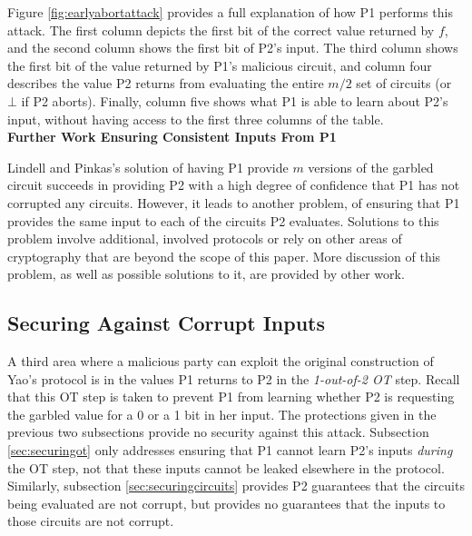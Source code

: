 Figure \ref{fig:earlyabortattack} provides a full explanation of how \ac{P1} performs this attack.  The first column depicts the first bit of the correct value returned by $f$, and the second column shows the first bit of \ac{P2}'s input.  The third column shows the first bit of the value returned by \ac{P1}'s malicious circuit, and column four describes the value \ac{P2} returns from evaluating the entire $m/2$ set of circuits (or $\bot$ if \ac{P2} aborts).  Finally, column five shows what \ac{P1} is able to learn about \ac{P2}'s input, without having access to the first three columns of the table.\\[.5em]


\noindent\textbf{Further Work Ensuring Consistent Inputs From \ac{P1}}

Lindell and Pinkas's\cite{lindell2007efficient} solution of having \ac{P1} provide $m$ versions of the garbled circuit succeeds in providing \ac{P2} with a high degree of confidence that \ac{P1} has not corrupted any circuits.  However, it leads to another problem, of ensuring that \ac{P1} provides the same input to each of the circuits \ac{P2} evaluates.  Solutions to this problem involve additional, involved protocols\cite{lindell2007efficient} or rely on other areas of cryptography\cite{shen2011two} that are beyond the scope of this paper.  More discussion of this problem, as well as possible solutions to it, are provided by other work\cite{kreuter2012billion}.


\subsection{Securing Against Corrupt Inputs}
\label{sub:inputattacks}

A third area where a malicious party can exploit the original construction of Yao's protocol is in the values \ac{P1} returns to \ac{P2} in the \emph{1-out-of-2 \ac{OT}} step.  Recall that this \ac{OT} step is taken to prevent \ac{P1} from learning whether \ac{P2} is requesting the garbled value for a 0 or a 1 bit in her input.  The protections given in the previous two subsections provide no security against this attack. Subsection \ref{sec:securingot} only addresses ensuring that \ac{P1} cannot learn \ac{P2}'s inputs \emph{during} the \ac{OT} step, not that these inputs cannot be leaked elsewhere in the protocol.  Similarly, subsection \ref{sec:securingcircuits} provides \ac{P2} guarantees that the circuits being evaluated are not corrupt, but provides no guarantees that the inputs to those circuits are not corrupt.

